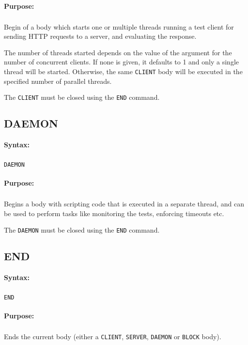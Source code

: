 \paragraph{Purpose:}
\subparagraph{}
Begin of a body which starts one or multiple threads running a test client for sending 
HTTP requests to a server, and evaluating the response.

The number of threads started depends on the value of the argument for 
the number of concurrent clients. If none is given, it defaults to 1 and 
only a single thread will be started. Otherwise, the same \texttt{CLIENT} body will 
be executed in the specified number of parallel threads.

The \texttt{CLIENT} must be closed using the \texttt{END} command.


\subsection{DAEMON}

\paragraph{Syntax:}
\subparagraph{}
\texttt{DAEMON}

\paragraph{Purpose:}
\subparagraph{}
Begins a body with scripting code that is executed in a separate 
thread, and can be used to perform tasks like monitoring the 
tests, enforcing timeouts etc.

The \texttt{DAEMON} must be closed using the \texttt{END} command.


\subsection{END}

\paragraph{Syntax:}
\subparagraph{}
\texttt{END}

\paragraph{Purpose:}
\subparagraph{}
Ends the current body (either a \texttt{CLIENT}, \texttt{SERVER}, \texttt{DAEMON} 
or \texttt{BLOCK} body). 


